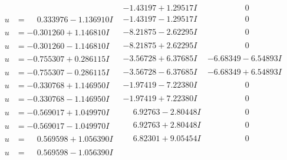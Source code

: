 \documentclass[1p]{elsarticle_modified}
\theoremstyle{definition}
\begin{document}
$$\begin{array}{c|c|c}
 & -1.43197 + 1.29517 I & \phantom{-0.000000 } 0 \\ \hline\begin{aligned}
u &= \phantom{-}0.333976 - 1.136910 I\end{aligned}
 & -1.43197 - 1.29517 I & \phantom{-0.000000 } 0 \\ \hline\begin{aligned}
u &= -0.301260 + 1.146810 I\end{aligned}
 & -8.21875 - 2.62295 I & \phantom{-0.000000 } 0 \\ \hline\begin{aligned}
u &= -0.301260 - 1.146810 I\end{aligned}
 & -8.21875 + 2.62295 I & \phantom{-0.000000 } 0 \\ \hline\begin{aligned}
u &= -0.755307 + 0.286115 I\end{aligned}
 & -3.56728 + 6.37685 I & -6.68349 - 6.54893 I \\ \hline\begin{aligned}
u &= -0.755307 - 0.286115 I\end{aligned}
 & -3.56728 - 6.37685 I & -6.68349 + 6.54893 I \\ \hline\begin{aligned}
u &= -0.330768 + 1.146950 I\end{aligned}
 & -1.97419 - 7.22380 I & \phantom{-0.000000 } 0 \\ \hline\begin{aligned}
u &= -0.330768 - 1.146950 I\end{aligned}
 & -1.97419 + 7.22380 I & \phantom{-0.000000 } 0 \\ \hline\begin{aligned}
u &= -0.569017 + 1.049970 I\end{aligned}
 & \phantom{-}6.92763 - 2.80448 I & \phantom{-0.000000 } 0 \\ \hline\begin{aligned}
u &= -0.569017 - 1.049970 I\end{aligned}
 & \phantom{-}6.92763 + 2.80448 I & \phantom{-0.000000 } 0 \\ \hline\begin{aligned}
u &= \phantom{-}0.569598 + 1.056390 I\end{aligned}
 & \phantom{-}6.82301 + 9.05454 I & \phantom{-0.000000 } 0 \\ \hline\begin{aligned}
u &= \phantom{-}0.569598 - 1.056390 I\end{aligned}

\end{array}$$
\end{document}
